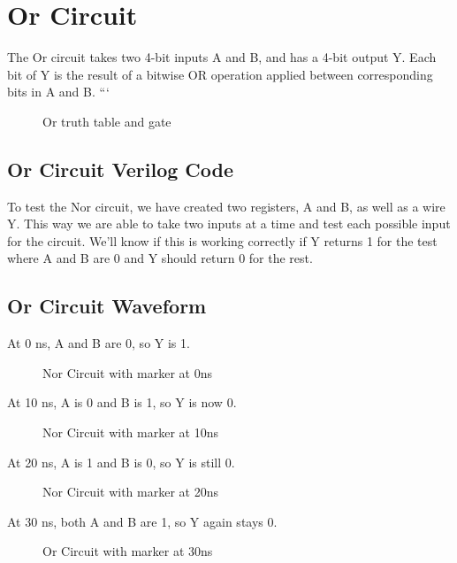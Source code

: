 \documentclass[12pt]{article}
\begin{document}
 \section{Or Circuit}
 The Or circuit takes two 4-bit inputs A and B, and has a 4-bit output Y. Each bit of Y is the result of a bitwise OR operation applied between corresponding bits in A and B.
```\begin{figure}[H]
    \centering
    \caption{Or truth table and gate}
    \label{fig:shift-table}
\end{figure}

\subsection{Or Circuit Verilog Code}


To test the Nor circuit, we have created two registers, A and B, as well as a wire Y. This way we are able to take two inputs at a time and test each possible input for the circuit. We'll know if this is working correctly if Y returns 1 for the test where A and B are 0 and Y should return 0 for the rest.
%
\subsection{Or Circuit Waveform}

At 0 ns, A and B are 0, so Y is 1.
\begin{figure}[H]
    \centering
    \caption{Nor Circuit with marker at 0ns}
    \label{fig:enter-label}
\end{figure}

At 10 ns, A is 0 and B is 1, so Y is now 0.
\begin{figure}[H]
    \centering
    \caption{Nor Circuit with marker at 10ns}
    \label{fig:enter-label}
\end{figure}

At 20 ns, A is 1 and B is 0, so Y is still 0.
\begin{figure}[H]
    \centering
    \caption{Nor Circuit with marker at 20ns}
    \label{fig:enter-label}
\end{figure}

At 30 ns, both A and B are 1, so Y again stays 0.
\begin{figure}[H]
    \centering
    \caption{Or Circuit with marker at 30ns}
    \label{fig:enter-label}
\end{figure}
\end{document}
